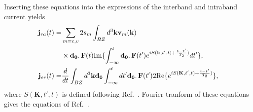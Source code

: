 \documentclass[a4paper,11pt]{report}
\renewcommand{\vec}[1]{\mathbf{#1}}
\begin{document}
Inserting these equations into the expressions of the interband and intraband current yields
\begin{subequations}
 \begin{align}
  \vec{j}_{ra}(t) =& \sum_{m=c,v} 2s_m \int_{BZ}d^3\vec{k}\vec{v}_m(\vec{k}) \nonumber\\
   &\times \vec{d_{0}}\ldotp\vec{F}(t)\mathrm{Im}\{\int_{-\infty}^{t}\vec{d_{0}}\ldotp\vec{F}(t')e^{iS(\vec{k},t',t)+\frac{t-t'}{T_2})}dt'\},\\
  \vec{j}_{er}(t) =& \frac{d}{dt}\int_{BZ}d^3\vec{k}  \vec{d_0}\int_{-\infty}^{t}dt'\vec{d_{0}}\ldotp\vec{F}(t')2\mathrm{Re}\{e^{iS(\vec{K},t',t)+\frac{t-t'}{T_2})}\},
 \end{align}
\end{subequations}
where $S(\vec{K},t',t)$ is defined following Ref.~\cite{PhysRevLett.113.073901}.
Fourier tranform of these equations gives the equations of Ref.~\cite{PhysRevLett.113.073901}.

% 
% 
% 
% 




\end{document}
